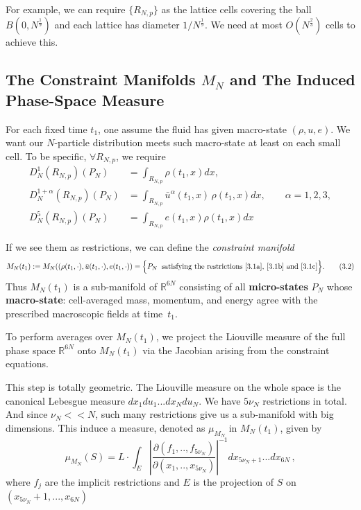 \documentclass[11pt]{article}
\begin{document}
For example, we can require $\{R_{N,p}\}$ as the lattice cells covering the ball $B(0,N^\frac{1}{9})$ and each lattice has diameter $1/N^\frac{1}{9}$. We need at most $O(N^{\frac{2}{3}})$ cells to achieve this.


\subsection{The Constraint Manifolds $M_N$ and The Induced Phase-Space Measure}

For each fixed time $t_1$, one assume the fluid has given macro-state $(\rho,u,e)$. We want our $N$-particle distribution meets such macro-state at least on each small cell. To be specific, $\forall R_{N,p}$, we require
\begin{align}  
    D_N^1(R_{N,p})(P_N) &= \int_{R_{N,p}}\rho(t_1,x)dx,\label{3.1a}\tag{3.1a}
\\
D_N^{1+\alpha}(R_{N,p})(P_N) &=  \int_{R_{N,p}}\bar{u}^\alpha(t_1,x)\,\rho(t_1,x)dx, \qquad \alpha = 1,2,3, \label{3.1b}\tag{3.1b}
\\
D_N^5(R_{N,p})(P_N) &= \int_{R_{N,p}}e(t_1,x)\rho(t_1,x)dx
\label{3.1c}\tag{3.1c}
\end{align}

If we see them as restrictions, we can define the \emph{constraint manifold}
\[
M_N(t_1):=M_N((\rho(t_1,\cdot),\bar{u}(t_1,\cdot),e(t_1,\cdot))
=
\Big\{ P_N\;\; \text{satisfying the restrictions \eqref{3.1a}, \eqref{3.1b} and \eqref{3.1c}}\Big\}.
\tag{3.2}\label{3.2}
\]
Thus $M_N(t_1)$ is a sub-manifold of $\mathbb{R}^{6N}$ consisting of all \textbf{micro-states} $P_N$ whose \textbf{macro-state}:
cell-averaged mass, momentum, and energy agree with the prescribed macroscopic fields at time~$t_1$.

To perform averages over $M_N(t_1)$, we project the Liouville measure of the full phase space $\mathbb{R}^{6N}$ onto $M_N(t_1)$ via the Jacobian arising from the constraint equations.

This step is totally geometric. The Liouville measure on the whole space is the canonical Lebesgue measure $dx_1du_1...dx_Ndu_N$. We have
$5\nu_N$ restrictions in total. And since $\nu_N << N$, such many restrictions give us a sub-manifold with big dimensions. This induce a measure, denoted as $\mu_{M_N}$ in $M_N(t_1)$, given by
\[\tag{3.3}\label{3.3}
\mu_{M_N}(S)=L\cdot\int_E |\frac{\partial (f_1,..,f_{5\nu_N})}{\partial(x_1,..,x_{5\nu_N})}|^{-1}dx_{5\nu_N+1}...dx_{6N}\,,
\]
where $f_j$ are the implicit restrictions and $E$ is the projection of $S$ on $(x_{5\nu_N}+1,...,x_{6N})$
\end{document}
